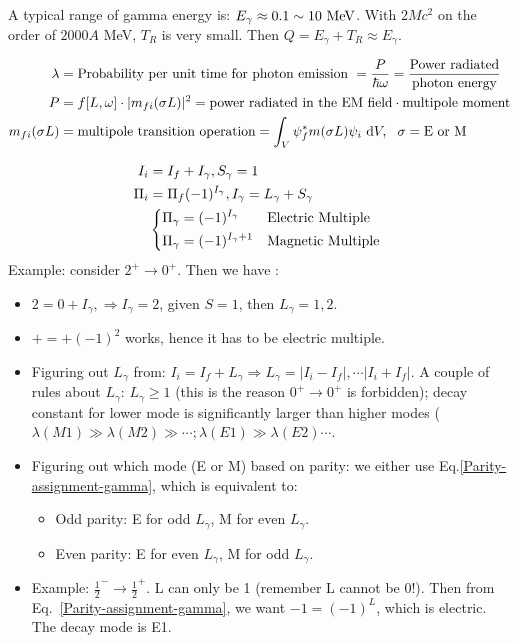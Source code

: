 \documentclass{school-22.101-notes}
\begin{document}
A typical range of gamma energy is: $E_{\gamma} \approx 0.1 \sim 10 \mbox{ } \mathrm{MeV}$. With $2Mc^2$ on the order of $2000 A$ MeV, $T_R$ is very small. Then $Q = E_{\gamma} + T_R \approx E_{\gamma}$.

\begin{align}
\lambda &= \mbox{Probability per unit time for photon emission } = \frac{P}{\hbar \omega} = \frac{\mbox{Power radiated}}{\mbox{photon energy}} \\
P&= f[L,\omega] \cdot |m_{fi} (\sigma L)|^2 = \mbox{power radiated in the EM field} \cdot \mbox{multipole moment} \\
m_{fi} (\sigma L) &= \mbox{multipole transition operation} = \int_V \psi_f^* m(\sigma L) \psi_i \mbox{ }\mathrm{d} V, \mbox{ } \mbox{ } \sigma = \mbox{E or M} 
\end{align}

\begin{align}
I_i &= I_f + I_{\gamma}, S_{\gamma} = 1 \\
\Pi_i &= \Pi_f (-1)^{I_{\gamma}}, I_{\gamma} = L_{\gamma} + S_{\gamma} \\
&\begin{dcases*}
\Pi_{\gamma} = (-1)^{I_{\gamma}} & Electric Multiple \\
\Pi_{\gamma} = (-1)^{I_{\gamma} +1 } & Magnetic Multiple
\end{dcases*} \label{Parity-assignment-gamma}
\end{align}
Example: consider $2^+ \to 0^+$. Then we have : 
\begin{itemize}
\item $2 = 0 + I_{\gamma}, \Rightarrow I_{\gamma} = 2$, given $S=1$, then $L_{\gamma} = 1,2$. 
\item $+ = +(-1)^{2}$ works, hence it has to be electric multiple. 
\end{itemize}
\begin{itemize}
\item Figuring out $L_{\gamma}$ from: $I_i = I_f + L_{\gamma} \Rightarrow L_{\gamma} = |I_i - I_f|, \cdots |I_i + I_f|$. A couple of rules about $L_{\gamma}$: $L_{\gamma} \ge 1$ (this is the reason $0^+ \to 0^+$ is forbidden); decay constant for lower mode is significantly larger than higher modes ($\lambda (M1) \gg \lambda(M2) \gg \cdots; \lambda(E1) \gg \lambda(E2) \cdots$.
\item Figuring out which mode (E or M) based on parity: we either use Eq.\ref{Parity-assignment-gamma}, which is equivalent to:
    \begin{itemize}
    \item Odd parity: E for odd $L_{\gamma}$, M for even $L_{\gamma}$. 
    \item Even parity: E for even $L_{\gamma}$, M for odd $L_{\gamma}$. 
    \end{itemize}
\item Example: $\frac{1}{2}^- \to \frac{1}{2}^+$. L can only be 1 (remember L cannot be 0!). Then from Eq.~\ref{Parity-assignment-gamma}, we want $-1 = (-1)^L$, which is electric. The decay mode is E1. 
\end{itemize}
\end{document}
